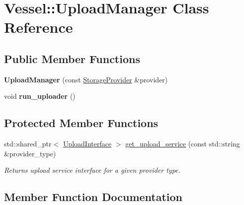 \hypertarget{class_vessel_1_1_upload_manager}{}\section{Vessel\+:\+:Upload\+Manager Class Reference}
\label{class_vessel_1_1_upload_manager}
\subsection*{Public Member Functions}
\begin{DoxyCompactItemize}
\item 
\mbox{\label{class_vessel_1_1_upload_manager_a970b8771380570df1b9e806d511b89ec}} 
{\bfseries Upload\+Manager} (const \hyperlink{struct_vessel_1_1_types_1_1_storage_provider}{Storage\+Provider} \&provider)
\item 
\mbox{\label{class_vessel_1_1_upload_manager_a784c68f70fe1fc92f5a96eaecd478bb6}} 
void {\bfseries run\+\_\+uploader} ()
\end{DoxyCompactItemize}
\subsection*{Protected Member Functions}
\begin{DoxyCompactItemize}
\item 
std\+::shared\+\_\+ptr$<$ \hyperlink{class_vessel_1_1_upload_interface}{Upload\+Interface} $>$ \hyperlink{class_vessel_1_1_upload_manager_af14717ef86433c109f5429671b3ea0fd}{get\+\_\+upload\+\_\+service} (const std\+::string \&provider\+\_\+type)
\begin{DoxyCompactList}\small\item\em Returns upload service interface for a given provider type. \end{DoxyCompactList}\end{DoxyCompactItemize}


\subsection{Member Function Documentation}
\mbox{\label{class_vessel_1_1_upload_manager_af14717ef86433c109f5429671b3ea0fd}} 
